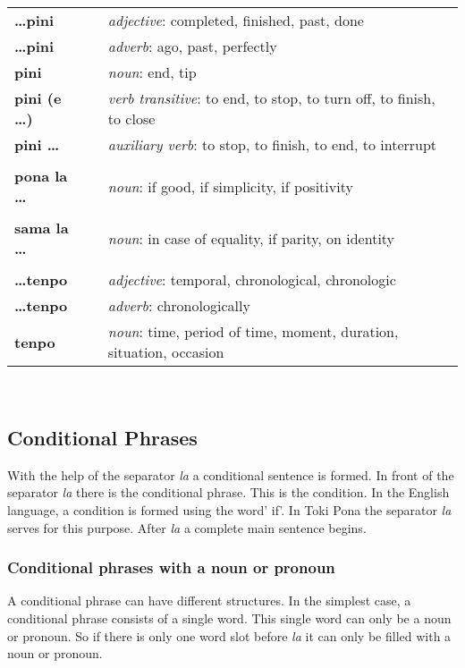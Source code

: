 \begin{supertabular}{p{2,5cm}|ll}
\textbf{\dots pini} && \textit{adjective}: completed, finished, past, done \\ %
\textbf{\dots pini} && \textit{adverb}: ago, past, perfectly \\ %
\textbf{pini} && \textit{noun}: end, tip \\ %
\textbf{pini (e \dots)} && \textit{verb transitive}: to end, to stop, to turn off, to finish, to close \\ %
\textbf{pini \dots } && \textit{auxiliary verb}: to stop, to finish, to end, to interrupt \\ %
 && \\ %
\textbf{pona la \dots} && \textit{noun}: if good, if simplicity, if positivity \\ %
 && \\ %
\textbf{sama la \dots} && \textit{noun}: in case of equality, if parity, on identity  \\  
 && \\ %
\textbf{\dots tenpo} && \textit{adjective}: temporal, chronological, chronologic \\ %
\textbf{\dots tenpo} && \textit{adverb}: chronologically \\ %
\textbf{tenpo} && \textit{noun}: time, period of time, moment, duration, situation, occasion \\ %
\end{supertabular} \\
%
\newpage
{}
\subsection*{Conditional Phrases}
%
With the help of the separator \textit{la} a conditional sentence is formed.
In front of the separator \textit{la} there is the conditional phrase. 
This is the condition. 
In the English language, a condition is formed using the word' if'.
In Toki Pona the separator \textit{la} serves for this purpose. 
After \textit{la} a complete main sentence begins.

\subsubsection*{Conditional phrases with a noun or pronoun}
%
A conditional phrase can have different structures. 
In the simplest case, a conditional phrase consists of a single word. 
This single word can only be a noun or pronoun. 
So if there is only one word slot before \textit{la} it can only be filled with a noun or pronoun. 

